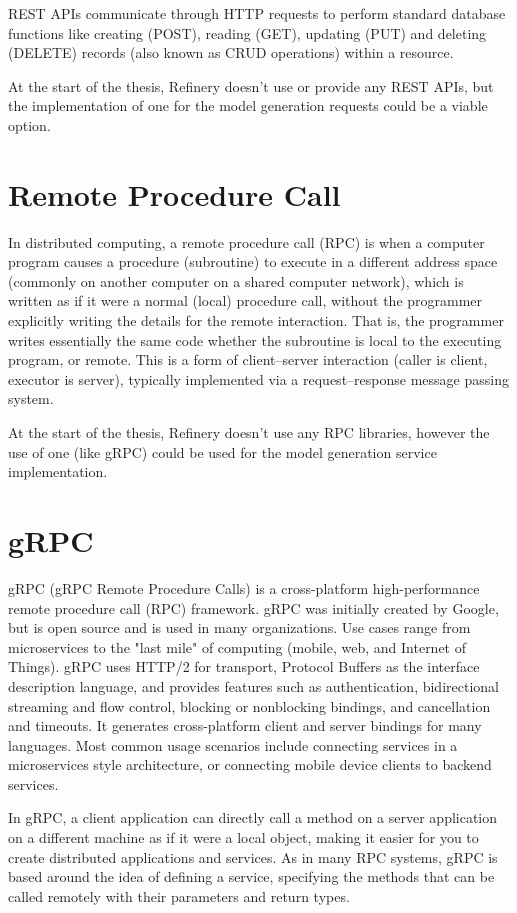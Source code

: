 	REST APIs communicate through HTTP requests to perform standard database functions like creating (POST), reading (GET),
	updating (PUT) and deleting (DELETE) records (also known as CRUD operations) within a resource.

	At the start of the thesis, Refinery doesn't use or provide any REST APIs, but the implementation of one for the model generation requests could be a viable option.

\section{Remote Procedure Call}
	In distributed computing, a remote procedure call (RPC) \cite{rpc} is when a computer program causes a procedure (subroutine) to execute in a different address space 
	(commonly on another computer on a shared computer network), which is written as if it were a normal (local) procedure call, without the programmer 
	explicitly writing the details for the remote interaction. That is, the programmer writes essentially the same code whether the subroutine is local to 
	the executing program, or remote.
	This is a form of client–server interaction (caller is client, executor is server), typically implemented via a request–response message passing system.

	At the start of the thesis, Refinery doesn't use any RPC libraries, however the use of one (like gRPC) could be used for the model generation service implementation.

\section{gRPC}
	gRPC (gRPC Remote Procedure Calls) \cite{grpcwiki} is a cross-platform high-performance remote procedure call (RPC) framework. 
	gRPC was initially created by Google, but is open source and is used in many organizations. 
	Use cases range from microservices to the "last mile" of computing (mobile, web, and Internet of Things). 
	gRPC uses HTTP/2 for transport, Protocol Buffers as the interface description language, and provides features such as authentication,
	bidirectional streaming and flow control, blocking or nonblocking bindings, and cancellation and timeouts. 
	It generates cross-platform client and server bindings for many languages. Most common usage scenarios include connecting services in a microservices 
	style architecture, or connecting mobile device clients to backend services.

	In gRPC, a client application can directly call a method on a server application on a different machine as if it were a local object, 
	making it easier for you to create distributed applications and services. As in many RPC systems, gRPC is based around the idea of 
	defining a service, specifying the methods that can be called remotely with their parameters and return types. \cite{grpcspec}
	
